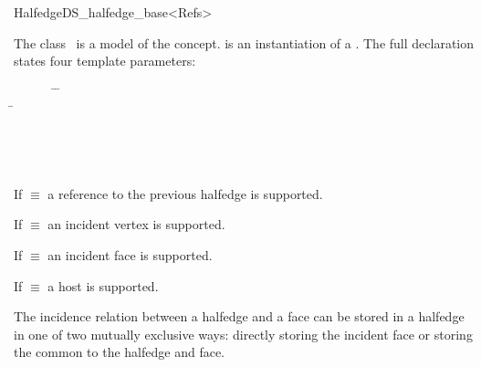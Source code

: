 
\ccRefPageBegin



\begin{ccRefClass}{HalfedgeDS_halfedge_base<Refs>}

\ccDefinition
  
The class \ccRefName\ is a model of the 
concept.  is an instantiation of a . 
The full declaration states four template parameters:

\begin{tabbing}
\mbox{}~~~~~~ \=  \=\\
              \> \> \=\\
              \> \> \>\\
              \> \> \>\\
              \> \> \>\\
     \> 
\end{tabbing}

If  $\equiv$  a reference to the previous
halfedge is supported.

If  $\equiv$  an incident vertex is
supported.

If  $\equiv$  an incident face is
supported.

{\XHDS If  $\equiv$  a host  is
supported.}

{\XHDS
The incidence relation between a halfedge and a face can be stored in a halfedge in 
one of two mutually exclusive ways: directly storing the incident face or
storing the  common to the halfedge and face.
}


\end{ccRefClass}
